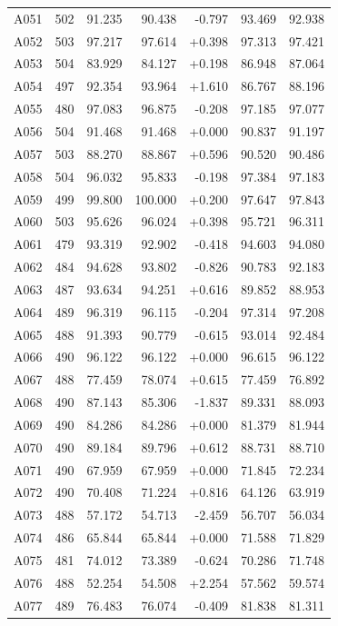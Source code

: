 \begin{longtable}{lrrrrrr}
A051 & 502 & 91.235 & 90.438 & -0.797 & 93.469 & 92.938 \\
A052 & 503 & 97.217 & 97.614 & +0.398 & 97.313 & 97.421 \\
A053 & 504 & 83.929 & 84.127 & +0.198 & 86.948 & 87.064 \\
A054 & 497 & 92.354 & 93.964 & +1.610 & 86.767 & 88.196 \\
A055 & 480 & 97.083 & 96.875 & -0.208 & 97.185 & 97.077 \\
A056 & 504 & 91.468 & 91.468 & +0.000 & 90.837 & 91.197 \\
A057 & 503 & 88.270 & 88.867 & +0.596 & 90.520 & 90.486 \\
A058 & 504 & 96.032 & 95.833 & -0.198 & 97.384 & 97.183 \\
A059 & 499 & 99.800 & 100.000 & +0.200 & 97.647 & 97.843 \\
A060 & 503 & 95.626 & 96.024 & +0.398 & 95.721 & 96.311 \\
A061 & 479 & 93.319 & 92.902 & -0.418 & 94.603 & 94.080 \\
A062 & 484 & 94.628 & 93.802 & -0.826 & 90.783 & 92.183 \\
A063 & 487 & 93.634 & 94.251 & +0.616 & 89.852 & 88.953 \\
A064 & 489 & 96.319 & 96.115 & -0.204 & 97.314 & 97.208 \\
A065 & 488 & 91.393 & 90.779 & -0.615 & 93.014 & 92.484 \\
A066 & 490 & 96.122 & 96.122 & +0.000 & 96.615 & 96.122 \\
A067 & 488 & 77.459 & 78.074 & +0.615 & 77.459 & 76.892 \\
A068 & 490 & 87.143 & 85.306 & -1.837 & 89.331 & 88.093 \\
A069 & 490 & 84.286 & 84.286 & +0.000 & 81.379 & 81.944 \\
A070 & 490 & 89.184 & 89.796 & +0.612 & 88.731 & 88.710 \\
A071 & 490 & 67.959 & 67.959 & +0.000 & 71.845 & 72.234 \\
A072 & 490 & 70.408 & 71.224 & +0.816 & 64.126 & 63.919 \\
A073 & 488 & 57.172 & 54.713 & -2.459 & 56.707 & 56.034 \\
A074 & 486 & 65.844 & 65.844 & +0.000 & 71.588 & 71.829 \\
A075 & 481 & 74.012 & 73.389 & -0.624 & 70.286 & 71.748 \\
A076 & 488 & 52.254 & 54.508 & +2.254 & 57.562 & 59.574 \\
A077 & 489 & 76.483 & 76.074 & -0.409 & 81.838 & 81.311 \\

\end{longtable}
